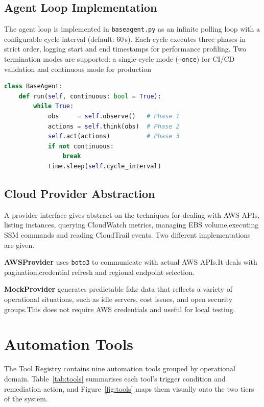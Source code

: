 \documentclass{ieeeaccess}
\begin{document}
\subsection{Agent Loop Implementation}

The agent loop is implemented in \texttt{baseagent.py} as an infinite polling
loop with a configurable cycle interval (default: 60\,s). Each cycle executes
three phases in strict order, logging start and end timestamps for performance
profiling. Two termination modes are supported: a single-cycle mode
(\texttt{--once}) for CI/CD validation and continuous mode for production


\begin{lstlisting}[language=Python,
  caption={Simplified agent loop (\texttt{baseagent.py})}]
class BaseAgent:
    def run(self, continuous: bool = True):
        while True:
            obs     = self.observe()   # Phase 1
            actions = self.think(obs)  # Phase 2
            self.act(actions)          # Phase 3
            if not continuous:
                break
            time.sleep(self.cycle_interval)
\end{lstlisting}

\subsection{Cloud Provider Abstraction}

A provider interface gives abstract on the techniques for dealing with AWS APIs, listing instances, querying CloudWatch metrics, managing EBS volume,executing SSM commands and reading CloudTrail events. Two different implementations are given.

\textbf{AWSProvider} uses \texttt{boto3} to communicate with actual AWS APIs.It deals with pagination,credential refresh and regional endpoint selection.

\textbf{MockProvider} generates predictable fake data that reflects a variety of operational situations, such as idle servers, cost issues, and open security groups.This does not require AWS credentials and useful for local testing.

\section{Automation Tools}
\label{sec:tools}

The Tool Registry contains nine automation tools grouped by operational
domain. Table~\ref{tab:tools} summarises each tool's trigger condition and remediation action, and Figure~\ref{fig:tools} maps them visually onto the
two tiers of the system.
\end{document}
